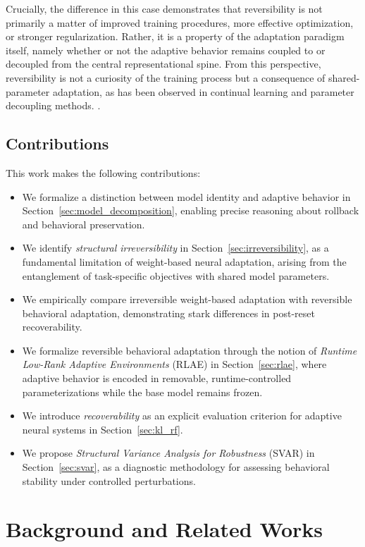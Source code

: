 \documentclass{article}
\begin{document}
	Crucially, the difference in this case demonstrates that reversibility is not primarily a matter of improved training procedures, more effective optimization, or stronger regularization. Rather, it is a property of the adaptation paradigm itself, namely whether or not the adaptive behavior remains coupled to or decoupled from the central representational spine. From this perspective, reversibility is not a curiosity of the training process but a consequence of shared-parameter adaptation, as has been observed in continual learning and parameter decoupling methods. \cite{delange2021continual,lanzillotta2023isolation}.
	
	\subsection{Contributions}
	\label{sect:contribution}
	
	This work makes the following contributions:
	\begin{itemize}
		\item We formalize a distinction between model identity and adaptive behavior in Section~\ref{sec:model_decomposition}, enabling precise reasoning about rollback and behavioral preservation.
		\item We identify \emph{structural irreversibility} in Section~\ref{sec:irreversibility}, as a fundamental limitation of weight-based neural adaptation, arising from the entanglement of task-specific objectives with shared model parameters.
		\item We empirically compare irreversible weight-based adaptation with reversible behavioral adaptation, demonstrating stark differences in post-reset recoverability.
		\item We formalize reversible behavioral adaptation through the notion of \emph{Runtime Low-Rank Adaptive Environments} (RLAE) in Section~\ref{sec:rlae}, where adaptive behavior is encoded in removable, runtime-controlled parameterizations while the base model remains frozen.
		\item We introduce \emph{recoverability} as an explicit evaluation criterion for adaptive neural systems in Section~\ref{sec:kl_rf}.
		\item We propose \emph{Structural Variance Analysis for Robustness} (SVAR) in Section~\ref{sec:svar}, as a diagnostic methodology for assessing behavioral stability under controlled perturbations.
	\end{itemize}
	
	
	\section{Background and Related Works}
	\label{sec:related_work}
	
\end{document}
